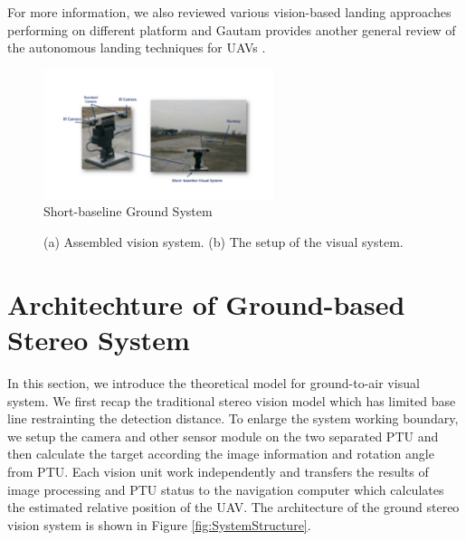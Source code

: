 \documentclass[journal,article,submit,moreauthors,pdftex,10pt,a4paper]{mdpi}
\begin{document}
For more information, we also reviewed various vision-based landing approaches performing on different platform \cite{kong2014vision} and Gautam provides another general review of the autonomous landing techniques for UAVs \cite{Gautam2014}.

\begin{figure}[!ht]
	\centering
	\includegraphics[width=0.6\textwidth]{Figs/chp08_18_ground_short_ptus.pdf}	
	\caption{Short-baseline Ground System}
	\label{fig:chp08_18_ground_short_ptus}
\end{figure}


\begin{figure}[!tb]
	\centering
	\caption{(a) Assembled vision system. (b) The setup of the visual system.}
\end{figure}


\section{Architechture of Ground-based Stereo System}
In this section, we introduce the theoretical model for ground-to-air visual system. We first recap the traditional stereo vision model which has limited base line restrainting the detection distance. To enlarge the system working boundary, we setup the camera and other sensor module on the two separated PTU and then calculate the target according the image information and rotation angle from PTU. Each vision unit work independently and transfers the results of image processing and PTU status to the navigation computer which calculates the estimated relative position of the UAV. The architecture of the ground stereo vision system is shown in Figure \ref{fig:SystemStructure}.
\end{document}

